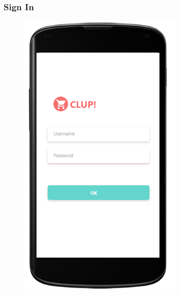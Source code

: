 \subsubsection{Sign In }
\begin{figure}[H]
  \centering
  \includegraphics[width=0.7\textwidth,keepaspectratio]{images/6.png}
\end{figure}

